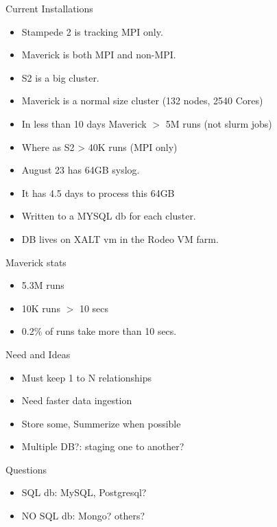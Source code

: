 \documentclass{beamer}
\begin{document}
\begin{frame}{Current Installations}
  \begin{itemize}
    \item Stampede 2 is tracking MPI only.
    \item Maverick is both MPI and non-MPI.
    \item S2 is a big cluster.
    \item Maverick is a normal size cluster (132 nodes, 2540 Cores)
    \item In less than 10 days Maverick $>$ 5M runs (not slurm jobs)
    \item Where as S2 > 40K runs (MPI only)
    \item August 23 has 64GB syslog. 
    \item It has 4.5 days to process this 64GB
    \item Written to a MYSQL db for each cluster.
    \item DB lives on XALT vm in the Rodeo VM farm.
  \end{itemize}
\end{frame}

\begin{frame}{Maverick stats}
  \begin{itemize}
    \item 5.3M runs
    \item 10K runs $>$ 10 secs
    \item 0.2\% of runs take more than 10 secs.
  \end{itemize}
\end{frame}

\begin{frame}{Need and Ideas}
  \begin{itemize}
    \item Must keep 1 to N relationships
    \item Need faster data ingestion
    \item Store some, Summerize when possible
    \item Multiple DB?: staging one to another?
  \end{itemize}
\end{frame}

\begin{frame}{Questions}
  \begin{itemize}
    \item SQL db: MySQL, Postgresql?
    \item NO SQL db: Mongo? others?
  \end{itemize}
\end{frame}
\end{document}
